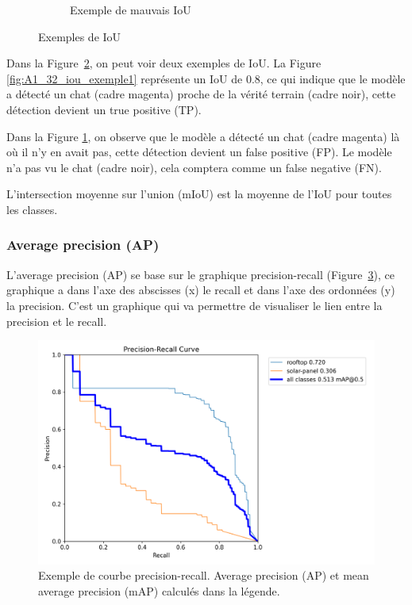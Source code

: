 \begin{figure}[H]
\begin{subfigure}[b]{0.48\textwidth}
        \caption{Exemple de mauvais IoU \cite{mechea_panoptic_2019}}
        \label{fig:A1_33_iou_exemple2}
    \end{subfigure}
    \caption{Exemples de IoU \cite{mechea_panoptic_2019}}
    \label{fig:iou_exemples}
\end{figure}

Dans la Figure~\ref{fig:iou_exemples}, on peut voir deux exemples de IoU. La Figure \ref{fig:A1_32_iou_exemple1} représente un IoU de 0.8, ce qui indique que le modèle a détecté un chat (cadre magenta) proche de la vérité terrain (cadre noir), cette détection devient un true positive (TP).

Dans la Figure \ref{fig:A1_33_iou_exemple2}, on observe que le modèle a détecté un chat (cadre magenta) là où il n'y en avait pas, cette détection devient un false positive (FP). Le modèle n'a pas vu le chat (cadre noir), cela comptera comme un false negative (FN).

L'intersection moyenne sur l'union (mIoU) est la moyenne de l'IoU pour toutes les classes.

\subsubsection{Average precision (AP)}

L'average precision (AP) se base sur le graphique precision-recall (Figure~\ref{fig:A1_34_precision_recall}), ce graphique a dans l'axe des abscisses (x) le recall et dans l'axe des ordonnées (y) la precision. C'est un graphique qui va permettre de visualiser le lien entre la precision et le recall.

\begin{figure}[H]
    \centering
    \includegraphics[width=1\linewidth]{03-tail//A1_fondamentaux_ML//A1_figures/A1_34_precision_recall.png}
    \caption{Exemple de courbe precision-recall. Average precision (AP) et mean average precision (mAP) calculés dans la légende.}
    \label{fig:A1_34_precision_recall}
\end{figure}

